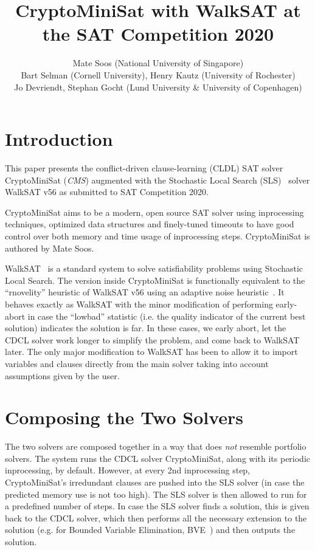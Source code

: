\documentclass[final]{ieee}
\begin{document}
\title{CryptoMiniSat with WalkSAT at the SAT Competition 2020}
\author{Mate Soos (National University of Singapore)\\
Bart Selman (Cornell University), Henry Kautz (University of Rochester)\\
Jo Devriendt, Stephan Gocht (Lund University \& University of Copenhagen)}

\maketitle
\thispagestyle{empty}
\pagestyle{empty}

\section{Introduction}
This paper presents the conflict-driven clause-learning (CLDL) SAT solver CryptoMiniSat (\emph{CMS}) augmented with the Stochastic Local Search (SLS)~\cite{Selman95localsearch} solver WalkSAT v56 as submitted to SAT Competition 2020.

CryptoMiniSat aims to be a modern, open source SAT solver using inprocessing techniques, optimized data structures and finely-tuned timeouts to have good control over both memory and time usage of inprocessing steps. CryptoMiniSat is authored by Mate Soos.

WalkSAT~\cite{DBLP:conf/aaai/KautzS96} is a standard system to solve satisfiability problems using Stochastic Local Search. The version inside CryptoMiniSat is functionally equivalent to the ``rnovelity'' heuristic of WalkSAT v56 using an adaptive noise heuristic~\cite{DBLP:conf/aaai/Hoos02}. It behaves exactly as WalkSAT with the minor modification of performing early-abort in case the ``lowbad'' statistic (i.e. the quality indicator of the current best solution) indicates the solution is far. In these cases, we early abort, let the CDCL solver work longer to simplify the problem, and come back to WalkSAT later. The only major modification to WalkSAT has been to allow it to import variables and clauses directly from the main solver taking into account assumptions given by the user.

\section{Composing the Two Solvers}
The two solvers are composed together in a way that does \emph{not} resemble portfolio solvers. The system runs the CDCL solver CryptoMiniSat, along with its periodic inprocessing, by default. However, at every 2nd inprocessing step, CryptoMiniSat's irredundant clauses are pushed into the SLS solver (in case the predicted memory use is not too high). The SLS solver is then allowed to run for a predefined number of steps. In case the SLS solver finds a solution, this is given back to the CDCL solver, which then performs all the necessary extension to the solution (e.g. for Bounded Variable Elimination, BVE~\cite{BVE}) and then outputs the solution.
\end{document}
